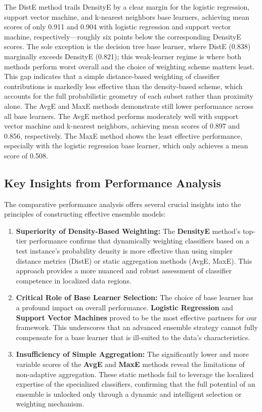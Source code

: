 \documentclass[lettersize,journal]{IEEEtran}
\begin{document}
	The DistE method trails DensityE by a clear margin for the logistic regression, support vector machine, and k-nearest neighbors base learners, achieving mean
	scores of only 0.911 and 0.904 with logistic regression and support vector machine, respectively—roughly six points below the corresponding DensityE scores. The sole exception is the decision tree base learner, where DistE (0.838) marginally exceeds DensityE (0.821); this weak-learner regime is where both methods perform worst overall and the choice of weighting scheme matters least. This gap indicates that a simple distance-based weighting of classifier contributions is markedly less effective than the density-based scheme, which accounts for the full probabilistic geometry of each subset rather than proximity alone. The AvgE and MaxE methods demonstrate still lower performance across all base learners. The
	AvgE method performs moderately well with support vector machine and
	k-nearest neighbors, achieving mean scores of 0.897 and 0.856, respectively.
	The MaxE method shows the least effective performance, especially with the
	logistic regression base learner, which only achieves a mean score of 0.508.
	
	\subsection{Key Insights from Performance Analysis}
	
	The comparative performance analysis offers several crucial insights into the principles of constructing effective ensemble models:
	
	\begin{enumerate}
		\item \textbf{Superiority of Density-Based Weighting:} The \textbf{DensityE} method's top-tier performance confirms that dynamically weighting classifiers based on a test instance's probability density is more effective than using simpler distance metrics (DistE) or static aggregation methods (AvgE, MaxE). This approach provides a more nuanced and robust assessment of classifier competence in localized data regions.
		
		\item \textbf{Critical Role of Base Learner Selection:} The choice of base learner has a profound impact on overall performance. \textbf{Logistic Regression} and \textbf{Support Vector Machines} proved to be the most effective partners for our framework. This underscores that an advanced ensemble strategy cannot fully compensate for a base learner that is ill-suited to the data's characteristics.
		
		\item \textbf{Insufficiency of Simple Aggregation:} The significantly lower and more variable scores of the \textbf{AvgE} and \textbf{MaxE} methods reveal the limitations of non-adaptive aggregation. These static methods fail to leverage the localized expertise of the specialized classifiers, confirming that the full potential of an ensemble is unlocked only through a dynamic and intelligent selection or weighting mechanism.
	\end{enumerate}
	
\end{document}
